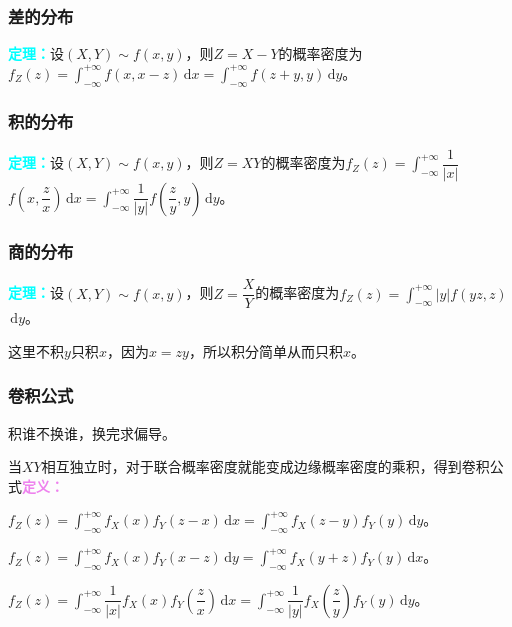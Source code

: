 \documentclass[UTF8, 12pt]{ctexart}
\begin{document}
\subsubsection{差的分布}

\textcolor{aqua}{\textbf{定理：}}设$(X,Y)\sim f(x,y)$，则$Z=X-Y$的概率密度为$f_Z(z)=\int_{-\infty}^{+\infty}f(x,x-z)\,\textrm{d}x=\int_{-\infty}^{+\infty}f(z+y,y)\,\textrm{d}y$。

\subsubsection{积的分布}

\textcolor{aqua}{\textbf{定理：}}设$(X,Y)\sim f(x,y)$，则$Z=XY$的概率密度为$f_Z(z)=\displaystyle{\int_{-\infty}^{+\infty}}\dfrac{1}{\vert x\vert}$\\$f\left(x,\dfrac{z}{x}\right)\,\textrm{d}x=\displaystyle{\int_{-\infty}^{+\infty}}\dfrac{1}{\vert y\vert}f\left(\dfrac{z}{y},y\right)\,\textrm{d}y$。

\subsubsection{商的分布}

\textcolor{aqua}{\textbf{定理：}}设$(X,Y)\sim f(x,y)$，则$Z=\dfrac{X}{Y}$的概率密度为$f_Z(z)=\displaystyle{\int_{-\infty}^{+\infty}}\vert y\vert f(yz,z)$\\$\,\textrm{d}y$。

这里不积$y$只积$x$，因为$x=zy$，所以积分简单从而只积$x$。

\subsubsection{卷积公式}

积谁不换谁，换完求偏导。

当$XY$相互独立时，对于联合概率密度就能变成边缘概率密度的乘积，得到卷积公式\textcolor{violet}{\textbf{定义：}}

$f_Z(z)=\int_{-\infty}^{+\infty}f_X(x)f_Y(z-x)\,\textrm{d}x=\int_{-\infty}^{+\infty}f_X(z-y)f_Y(y)\,\textrm{d}y$。

$f_Z(z)=\int_{-\infty}^{+\infty}f_X(x)f_Y(x-z)\,\textrm{d}y=\int_{-\infty}^{+\infty}f_X(y+z)f_Y(y)\,\textrm{d}x$。

$f_Z(z)=\displaystyle{\int_{-\infty}^{+\infty}}\dfrac{1}{\vert x\vert}f_X(x)f_Y\left(\dfrac{z}{x}\right)\,\textrm{d}x=\displaystyle{\int_{-\infty}^{+\infty}}\dfrac{1}{\vert y\vert}f_X\left(\dfrac{z}{y}\right)f_Y(y)\,\textrm{d}y$。
\end{document}
